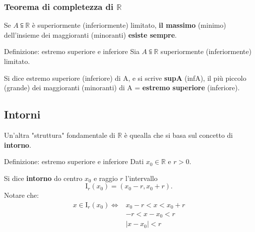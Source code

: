 \documentclass[x11names]{article}
\begin{document}
		\begin{center}
		\colorbox{myred}{\begin{minipage}{5.75in}
				\begin{redes}{}
					\subsubsection{Teorema di completezza di $\mathbb{R}$}
					Se $A \subseteqq \mathbb{R}$ è superiormente (inferiormente) limitato, \textbf{il massimo} (minimo) dell'insieme  dei maggioranti (minoranti) \textbf{esiste sempre}.
				\end{redes}
				\end{minipage}}        
		\end{center}
	\begin{center}
		\colorbox{myblue}{\begin{minipage}{5.75in}
				\begin{blues}{Definizione: estremo superiore e inferiore}
				Sia $A \subseteqq \mathbb{R}$  superiormente (inferiormente) limitato.
				
				Si dice estremo superiore (inferiore) di A, e si scrive \textbf{supA} (infA), il più piccolo (grande) dei maggioranti (minoranti) di A = \textbf{estremo superiore} (inferiore).
				\end{blues}
		\end{minipage}}       
	\end{center}
	\subsection{Intorni}
	Un'altra  "struttura" fondamentale di $\mathbb{R}$ è quealla che si basa sul concetto di \textbf{intorno}.
	
	\begin{center}
		\colorbox{myblue}{\begin{minipage}{5.75in}
				\begin{blues}{Definizione: estremo superiore e inferiore}
					Dati $x_0 \in \mathbb{R}$ e $r > 0$.
					
					Si dice \textbf{intorno} do centro $x_0$ e raggio $r$ l'intervallo 
					\[
					\text{I}_r (x_0) = (x_0 -r, x_0 +r)
					.\]
					Notare che:
					\begin{align*}
						x \in \text{I}_r(x_0) \Longleftrightarrow & x_0 - r < x < x_0 + r \\
						& - r < x -x_0 < r \\
						& |x-x_0| < r
					\end{align*}
					
					
				\end{blues}
		\end{minipage}}       
	\end{center}
	
\end{document}
